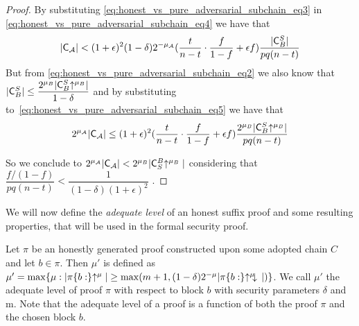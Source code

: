\begin{proof}
	By substituting \ref{eq:honest_vs_pure_adversarial_subchain_eq3} in \ref{eq:honest_vs_pure_adversarial_subchain_eq4} we have that
	\begin{equation}\label{eq:honest_vs_pure_adversarial_subchain_eq5}
		\lvert \mathsf{C}_\mathcal{A} \rvert < (1+\epsilon)^2(1-\delta)2^{-\mu_\mathcal{A}}( \dfrac{t}{n-t} \cdot \dfrac{f}{1-f} + \epsilon f) \dfrac{\lvert \mathsf{C}^S_B \rvert}{pq(n-t)}
	\end{equation}
	But from \ref{eq:honest_vs_pure_adversarial_subchain_eq2} we also know that $ \lvert \mathsf{C}_{B}^S \rvert \leq \dfrac{2^{\mu_B}\lvert \mathsf{C}_{B}^S \negthickspace\uparrow^{\mu_B} \rvert}{1- \delta}$ and by substituting to~\ref{eq:honest_vs_pure_adversarial_subchain_eq5} we have that 
	\begin{equation}
		2^{\mu_\mathcal{A}} \lvert \mathsf{C}_\mathcal{A} \rvert \leq (1+\epsilon)^2 ( \dfrac{t}{n-t} \cdot \dfrac{f}{1-f} + \epsilon f) \dfrac{2^{\mu_B}\lvert \mathsf{C}^S_B \negthickspace\uparrow^{\mu_B} \rvert}{pq(n-t)}
	\end{equation}

	So we conclude to $2^{\mu_\mathcal{A}} \vert \mathsf{C}_\mathcal{A} \vert
	<  2^{\mu_B} \vert    \mathsf{C}^{B}_{S}\negthickspace\uparrow^{\mu_B}\vert $ considering that $\dfrac{f/(1-f)}{pq(n-t)} < \dfrac{1}{(1-\delta)(1+\epsilon)^2}$ .
\end{proof}

We will now define the \emph{adequate level} of an honest suffix proof and some resulting properties, that will be used in the formal security proof.

\begin{defn}
	Let $\pi$ be an
	honestly generated proof constructed upon some adopted chain $C$ and let $b \in 
	\pi $. Then $\mu'$ is defined as $\mu' = \max \{ \mu: \vert \pi\{b:\}\negthickspace\uparrow^{\mu}
	\vert \geq \max( m+1, (1-\delta)2^{-\mu} \vert \pi\{b:\}\negthickspace\uparrow^{\mu}\negthickspace\downarrow\, \vert )\}$.
	We call $\mu'$ the adequate level of proof $\pi$ with respect to block $b$ with
	security parameters $\delta$ and m. Note that the adequate level of a proof is a
	function of both the proof $\pi$ and the chosen block $b$.
\end{defn}


